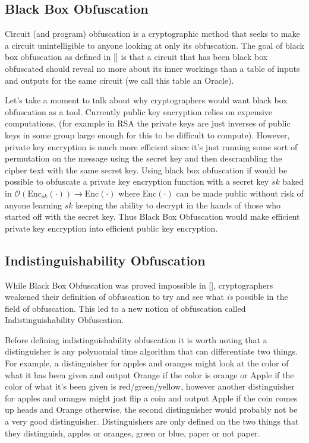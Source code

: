 \documentclass[12pt,twoside]{reedthesis}
\newcommand{\enc}[0]{\text{Enc}}
\begin{document}
    \subsection{Black Box Obfuscation}
     \par Circuit (and program) obfuscation is a cryptographic method that seeks to make a circuit unintelligible to anyone looking at only its obfuscation. The goal of black box obfuscation as defined in [\cite{vbb}] is that a circuit that has been black box obfuscated should reveal no more about its inner workings than a table of inputs and outputs for the same circuit (we call this table an Oracle).
         
     \par Let's take a moment to talk about why cryptographers would want black box obfuscation as a tool. Currently public key encryption relies on expensive computations, (for example in RSA the private keys are just inverses of public keys in some group large enough for this to be difficult to compute). However, private key encryption is much more efficient since it's just running some sort of permutation on the message using the secret key and then descrambling the cipher text with the same secret key. Using black box obfuscation if would be possible to obfuscate a private key encryption function with a secret key $sk$ baked in $\mathcal{O}(\enc_{sk}(\cdot)) \rightarrow \enc(\cdot)$ where $\enc(\cdot)$ can be made public without risk of anyone learning $sk$ keeping the ability to decrypt in the hands of those who started off with the secret key. Thus Black Box Obfuscation would make efficient private key encryption into efficient public key encryption.
    
    
    
    \subsection{Indistinguishability Obfuscation}
   
   
    While Black Box Obfuscation was proved impossible in [\cite{vbb}], cryptographers weakened their definition of obfuscation to try and see what \textit{is} possible in the field of obfuscation. This led to a new notion of obfuscation called Indistinguishability Obfuscation. 
    \par Before defining indistinguishability obfuscation it is worth noting that a distinguisher is any polynomial time algorithm that can differentiate two things. For example, a distinguisher for apples and oranges might look at the color of what it has been given and output  Orange if the color is orange or Apple if the color of what it's been given is red/green/yellow, however another distinguisher for apples and oranges might just flip a coin and output Apple if the coin comes up heads and Orange otherwise, the second distinguisher would probably not be a very good distinguisher. Distinguishers are only defined on the two things that they distinguish, apples or oranges, green or blue, paper or not paper.
       \newcommand{\iO}[0]{\textit{i}\mathcal{O}}
    
\end{document}
